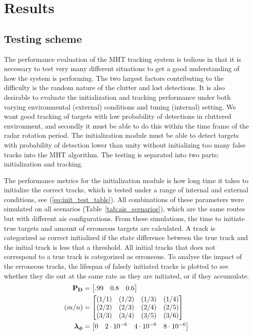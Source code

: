 \chapter{Results}\label{chapter:results}
\section{Testing scheme}
The performance evaluation of the MHT tracking system is tedious in that it is necessary to test very many different situations to get a good understanding of how the system is performing. The two largest factors contributing to the difficulty is the random nature of the clutter and lost detections. It is also desirable to evaluate the initialization and tracking performance under both varying environmental (external) conditions and tuning (internal) setting. We want good tracking of targets with low probability of detections in cluttered environment, and secondly it must be able to do this within the time frame of the radar rotation period. The initialization module must be able to detect targets with probability of detection lower than unity without initializing too many false tracks into the MHT algorithm. The testing is separated into two parts; initialization and tracking.


The performance metrics for the initialization module is how long time it takes to initialize the correct tracks, which is tested under a range of internal and external conditions, see (\ref{eq:init_test_table}). All combinations of these parameters were simulated on all scenarios (Table~\ref{tab:ais_scenarios}), which are the same routes but with different \gls{ais} configurations. 
 From these simulations, the time to initiate true targets and amount of erroneous targets are calculated. A track is categorized as correct initialized if the state difference between the true track and the initial track is less that a threshold. All initial tracks that does not correspond to a true track is categorized as erroneous. To analyse the impact of the erroneous tracks, the lifespan of falsely initiated tracks is plotted to see whether they die out at the same rate as they are initiated, or if they accumulate.
\begin{equation}\label{eq:init_test_table}
\begin{split}
\boldsymbol{\mathbf{P_D}} &= \begin{bmatrix} .99 & 0.8 & 0.6 \end{bmatrix} \\
(m/n) &= \begin{bmatrix} 	(1/1) & (1/2) & (1/3) & (1/4) \\
							(2/2) & (2/3) & (2/4) & (2/5) \\
							(3/3) & (3/4) & (3/5) & (3/6)
		   \end{bmatrix} \\
\boldsymbol{\mathbf{\lambda_\phi}} &= \begin{bmatrix} 0 & 2\cdot10^{-6} & 4\cdot10^{-6} & 8\cdot10^{-6}\end{bmatrix}
\end{split}
\end{equation}

